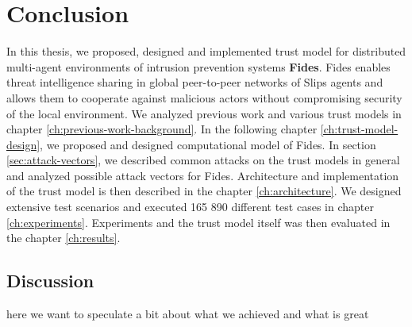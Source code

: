 \chapter{Conclusion}
\label{ch:conclusion}
In this thesis, we proposed, designed and implemented trust model for distributed multi-agent environments of intrusion prevention systems \textbf{Fides}.
Fides enables threat intelligence sharing in global peer-to-peer networks of Slips agents and allows them to cooperate against malicious actors without compromising security of the local environment. 
We analyzed previous work and various trust models in chapter \ref{ch:previous-work-background}.
In the following chapter \ref{ch:trust-model-design}, we proposed and designed computational model of Fides.
In section \ref{sec:attack-vectors}, we described common attacks on the trust models in general and analyzed possible attack vectors for Fides.
Architecture and implementation of the trust model is then described in the chapter \ref{ch:architecture}.
We designed extensive test scenarios and executed 165 890 different test cases in chapter \ref{ch:experiments}.
Experiments and the trust model itself was then evaluated in the chapter \ref{ch:results}.


\section{Discussion}
\label{sec:discussion}
here we want to speculate a bit about what we achieved and what is great

